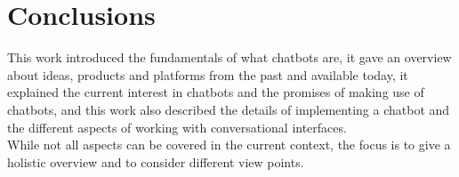 \chapter{Conclusions}


This work introduced the fundamentals of what chatbots are,
it gave an overview about ideas, products and platforms from the past and available today,
it explained the current interest in chatbots and the promises of making use of chatbots,
and this work also described the details of implementing a chatbot and the different aspects of working with conversational interfaces.
\\

While not all aspects can be covered in the current context,
the focus is to give a holistic overview and to consider different view points.
